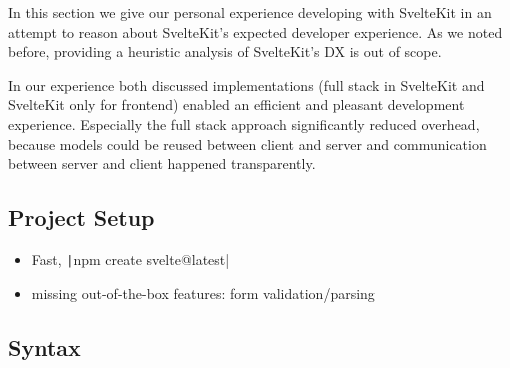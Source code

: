 
In this section we give our personal experience developing with SvelteKit in an attempt to reason about SvelteKit's expected developer experience. As we noted before, providing a heuristic analysis of SvelteKit's DX is out of scope.

In our experience both discussed implementations (full stack in SvelteKit and SvelteKit only for frontend) enabled an efficient and pleasant development experience. Especially the full stack approach significantly reduced overhead, because models could be reused between client and server and communication between server and client happened transparently.



\subsection{Project Setup}

\begin{itemize}
    \item Fast, \texttt|npm create svelte@latest|
    \item missing out-of-the-box features: form validation/parsing
\end{itemize}



\subsection{Syntax}

